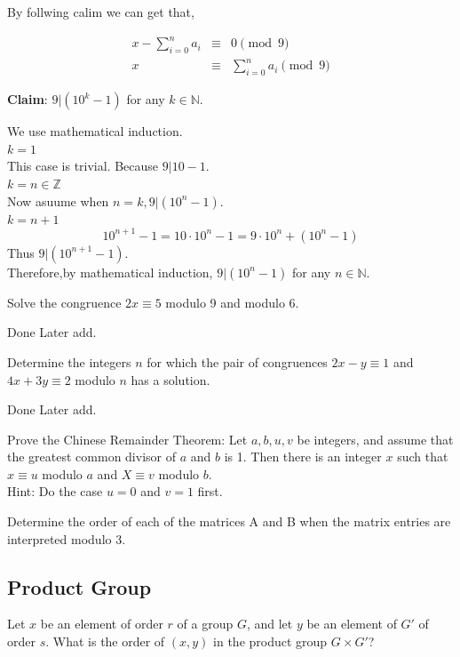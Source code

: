 \documentclass[
]{book}
\begin{document}
By follwing calim we can get that,

\begin{eqnarray}
x-\sum_{i=0}^n a_i &\equiv & 0 \pmod{9}\\
x &\equiv & \sum_{i=0}^na_i\pmod{9}
\end{eqnarray}

\textbf{Claim}: \(9|(10^k-1)\) for any \(k\in \mathbb{N}\).

We use mathematical induction.\\
\emph{\(k=1\)}\\
This case is trivial. Because \(9|10-1\).\\
\emph{\(k=n\in\mathbb{Z}\)}\\
Now asuume when \(n=k, 9|(10^n-1)\).\\
\emph{\(k=n+1\)}
\[10^{n+1}-1 =10\cdot 10^{n}-1=9\cdot 10^n + (10^n - 1) \] Thus
\(9\vert (10^{n+1}-1)\).\\
Therefore,by mathematical induction, \(9|(10^n-1)\) for any
\(n\in \mathbb{N}\).

\leavevmode{}%
Solve the congruence \(2x \equiv 5\) modulo 9 and modulo 6.

Done Later add.

\leavevmode{}%
Determine the integers \(n\) for which the pair of congruences
\(2x - y \equiv 1\) and \(4x + 3y \equiv 2\) modulo \(n\) has a
solution.

Done Later add.

\leavevmode{}%
Prove the Chinese Remainder Theorem: Let \(a, b, u, v\) be integers, and
assume that the greatest common divisor of \(a\) and \(b\) is 1. Then
there is an integer \(x\) such that \(x \equiv u\) modulo \(a\) and
\(X \equiv v\) modulo \(b\).\\
Hint: Do the case \(u = 0\) and \(v = 1\) first.

\leavevmode{}%
Determine the order of each of the matrices A and B when the matrix
entries are interpreted modulo 3.

\hypertarget{product-group}{%
\subsection{Product Group}\label{product-group}}

\leavevmode{}%
Let \(x\) be an element of order \(r\) of a group \(G\), and let \(y\)
be an element of \(G'\) of order \(s\). What is the order of \((x, y)\)
in the product group \(G \times G'\)?
\end{document}
